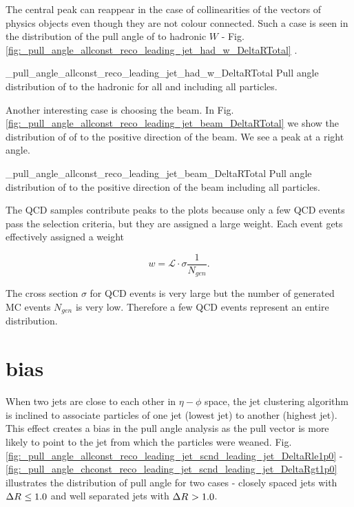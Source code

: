 The central peak can reappear in the case of collinearities of the vectors of physics objects even though they are not colour connected. Such a case is seen in the distribution of the pull angle of \leadingjet to hadronic $W$ - Fig. \ref{fig:_pull_angle_allconst_reco_leading_jet_had_w_DeltaRTotal}
. 

          {_pull_angle_allconst_reco_leading_jet_had_w_DeltaRTotal}
          {Pull angle distribution of \leadingjet to the hadronic \PW for all \DeltaR and including all particles.}

Another interesting case is choosing the beam. In Fig. \ref{fig:_pull_angle_allconst_reco_leading_jet_beam_DeltaRTotal} we show the distribution of \pullangle of \leadingjet to the positive direction of the beam. We see a peak at a right angle.

          {_pull_angle_allconst_reco_leading_jet_beam_DeltaRTotal}
          {Pull angle distribution of \leadingjet to the positive direction of the beam including all particles.}

The QCD samples contribute peaks to the plots because only a few QCD events pass the selection criteria, but they are assigned a large weight. Each event gets effectively assigned a weight

\begin{equation}
w=\mathcal{L}\cdot\sigma\frac{1}{N_{gen}}.
\end{equation}

The cross section $\sigma$ for QCD events is very large but the number of generated MC events $N_{gen}$ is very low. Therefore a few QCD events represent an entire distribution.

\section{\DeltaR bias}

When two jets are close to each other in $\eta-\phi$ space, the jet clustering algorithm is inclined to associate particles of one jet (lowest \pt jet) to another (highest \pt jet). This effect creates a bias in the pull angle analysis as the pull vector is more likely to point to the jet from which the particles were weaned. Fig. \ref{fig:_pull_angle_allconst_reco_leading_jet_scnd_leading_jet_DeltaRle1p0} - \ref{fig:_pull_angle_chconst_reco_leading_jet_scnd_leading_jet_DeltaRgt1p0} illustrates the distribution of pull angle for two cases - closely spaced jets with $\Delta R^{}\leq1.0$ and well separated jets with $\Delta R^{}>1.0$.

